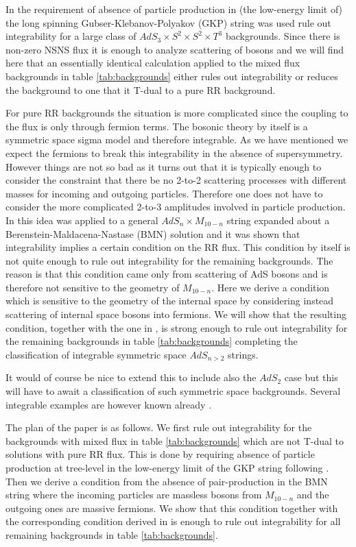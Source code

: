 \documentclass[a4paper,11pt]{article}
\begin{document}
In \cite{Wulff:2017hzy} the requirement of absence of particle production in (the low-energy limit of) the long spinning Gubser-Klebanov-Polyakov (GKP) string was used rule out integrability for a large class of $AdS_3\times S^2\times S^2\times T^3$ backgrounds. Since there is non-zero NSNS flux it is enough to analyze scattering of bosons and we will find here that an essentially identical calculation applied to the mixed flux backgrounds in table \ref{tab:backgrounds} either rules out integrability or reduces the background to one that it T-dual to a pure RR background.

For pure RR backgrounds the situation is more complicated since the coupling to the flux is only through fermion terms. The bosonic theory by itself is a symmetric space sigma model and therefore integrable. As we have mentioned we expect the fermions to break this integrability in the absence of supersymmetry. However things are not so bad as it turns out that it is typically enough to consider the constraint that there be no 2-to-2 scattering processes with different masses for incoming and outgoing particles. Therefore one does not have to consider the more complicated 2-to-3 amplitudes involved in particle production. In \cite{Wulff:2017lxh} this idea was applied to a general $AdS_n\times M_{10-n}$ string expanded about a Berenstein-Maldacena-Nastase (BMN) solution and it was shown that integrability implies a certain condition on the RR flux. This condition by itself is not quite enough to rule out integrability for the remaining backgrounds. The reason is that this condition came only from scattering of AdS bosons and is therefore not sensitive to the geometry of $M_{10-n}$. Here we derive a condition which is sensitive to the geometry of the internal space by considering instead scattering of internal space bosons into fermions. We will show that the resulting condition, together with the one in \cite{Wulff:2017lxh}, is strong enough to rule out integrability for the remaining backgrounds in table \ref{tab:backgrounds} completing the classification of integrable symmetric space $AdS_{n>2}$ strings.

It would of course be nice to extend this to include also the $AdS_2$ case but this will have to await a classification of such symmetric space backgrounds. Several integrable examples are however known already \cite{Sorokin:2011rr,Wulff:2014kja}.

The plan of the paper is as follows. We first rule out integrability for the backgrounds with mixed flux in table \ref{tab:backgrounds} which are not T-dual to solutions with pure RR flux. This is done by requiring absence of particle production at tree-level in the low-energy limit of the GKP string following \cite{Wulff:2017hzy}. Then we derive a condition from the absence of pair-production in the BMN string where the incoming particles are massless bosons from $M_{10-n}$ and the outgoing ones are massive fermions. We show that this condition together with the corresponding condition derived in \cite{Wulff:2017lxh} is enough to rule out integrability for all remaining backgrounds in table \ref{tab:backgrounds}.
\end{document}
